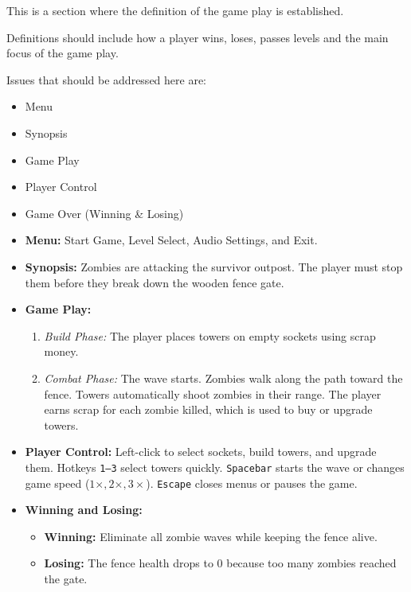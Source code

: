 \begin{guidance}
This is a section where the definition of the game play is established.

Definitions should include how a player wins, loses, passes levels and the main focus of the game play.

Issues that should be addressed here are:

\begin{itemize}[label=$\circ$]
  \item Menu
  \item Synopsis
  \item Game Play
  \item Player Control
  \item Game Over (Winning \& Losing)
\end{itemize}
\end{guidance}
\begin{itemize}[label=\textbullet]
  \item \textbf{Menu:} Start Game, Level Select, Audio Settings, and Exit.
  \item \textbf{Synopsis:} Zombies are attacking the survivor outpost. The player must stop them before they break down the wooden fence gate.
  \item \textbf{Game Play:}
    \begin{enumerate}
      \item \textit{Build Phase:} The player places towers on empty sockets using scrap money.
      \item \textit{Combat Phase:} The wave starts. Zombies walk along the path toward the fence. Towers automatically shoot zombies in their range. The player earns scrap for each zombie killed, which is used to buy or upgrade towers.
    \end{enumerate}
  \item \textbf{Player Control:} Left-click to select sockets, build towers, and upgrade them. Hotkeys \texttt{1--3} select towers quickly. \texttt{Spacebar} starts the wave or changes game speed ($1\times, 2\times, 3\times$). \texttt{Escape} closes menus or pauses the game.
  \item \textbf{Winning and Losing:}
    \begin{itemize}[label=$\circ$]
      \item \textbf{Winning:} Eliminate all zombie waves while keeping the fence alive.
      \item \textbf{Losing:} The fence health drops to 0 because too many zombies reached the gate.
    \end{itemize}
\end{itemize}


